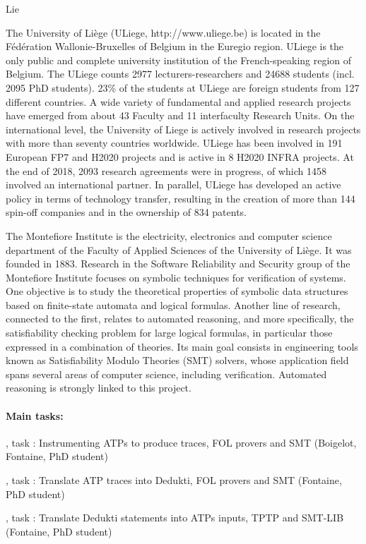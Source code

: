 \begin{sitedescription}{Lie}


The University of Liège (ULiege, http://www.uliege.be) is located in the Fédération Wallonie-Bruxelles of Belgium in the Euregio region. ULiege is the only public and complete university institution of the French-speaking region of Belgium. The ULiege counts 2977 lecturers-researchers and 24688 students (incl. 2095 PhD students). 23\% of the students at ULiege are foreign students from 127 different countries. A wide variety of fundamental and applied research projects have emerged from about 43 Faculty and 11 interfaculty Research Units. On the international level, the University of Liege is actively involved in research projects with more than seventy countries worldwide. ULiege has been involved in 191 European FP7 and H2020 projects and is active in 8 H2020 INFRA projects. At the end of 2018, 2093 research agreements were in progress, of which 1458 involved an international partner. In parallel, ULiege has developed an active policy in terms of technology transfer, resulting in the creation of more than 144 spin-off companies and in the ownership of 834 patents.

The Montefiore Institute is the electricity, electronics and computer science
department of the Faculty of Applied Sciences of the University of Liège.  It
was founded in 1883.  Research in the Software Reliability and Security group of
the Montefiore Institute focuses on symbolic techniques for verification of
systems.  One objective is to study the theoretical properties of symbolic data
structures based on finite-state automata and logical formulas.  Another line of
research, connected to the first, relates to automated reasoning, and more
specifically, the satisfiability checking problem for large logical formulas, in
particular those expressed in a combination of theories.  Its main goal consists
in engineering tools known as Satisfiability Modulo Theories (SMT) solvers,
whose application field spans several areas of computer science, including
verification.  Automated reasoning is strongly linked to this project.

\paragraph{Main tasks:}

\begin{compactitem}
\item {}, task : Instrumenting ATPs to produce traces, FOL provers and SMT (Boigelot, Fontaine, PhD student)
\item  {}, task : Translate ATP traces into Dedukti, FOL provers and SMT (Fontaine, PhD student)
\item {}, task : Translate Dedukti statements into ATPs inputs, TPTP and SMT-LIB (Fontaine, PhD student)
\end{compactitem}


\end{sitedescription}

